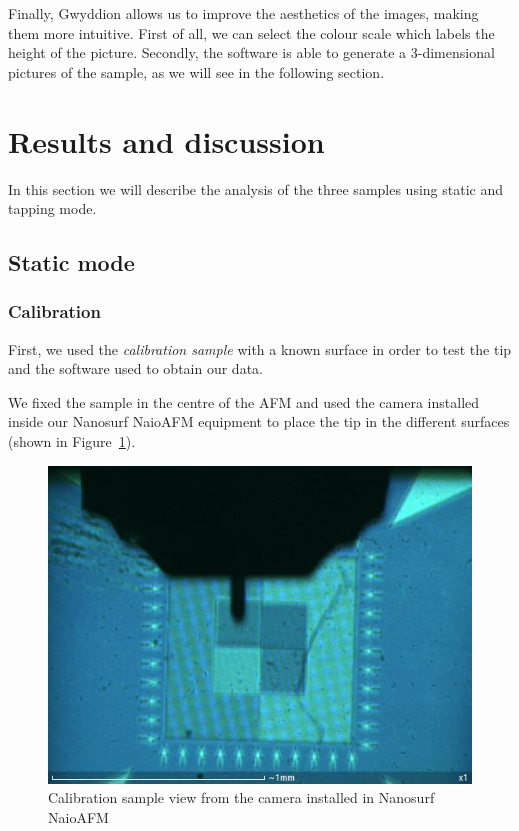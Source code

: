 \documentclass[11pt,a4paper]{article}
\begin{document}
Finally, Gwyddion allows us to improve the aesthetics of the images, making them more intuitive. First of all, we can select the colour scale which labels the height of the picture. Secondly, the software is able to generate a 3-dimensional pictures of the sample, as we will see in the following section.

\newpage
\section{Results and discussion}
In this section we will describe the analysis of the three samples using static and tapping mode. 

\subsection{Static mode}
\subsubsection{Calibration}
First, we used the \emph{calibration sample} with a known surface in order to test the tip and the software used to obtain our data. 

We fixed the sample in the centre of the AFM and used the camera installed inside our Nanosurf NaioAFM equipment to place the tip in the different surfaces (shown in Figure~\ref{fig:cal_sam}).

\begin{figure}[H]
\centering
\includegraphics[scale=0.4]{calibration_sample}
\caption{Calibration sample view from the camera installed in Nanosurf NaioAFM}
\label{fig:cal_sam}
\end{figure}
\end{document}
